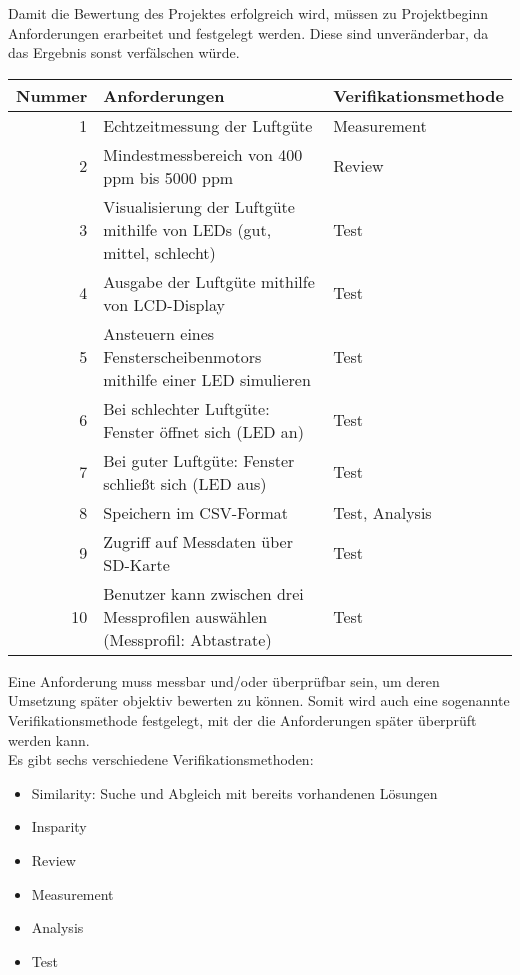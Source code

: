 \label{Anforderungen}

Damit die Bewertung des Projektes erfolgreich wird, müssen zu Projektbeginn Anforderungen erarbeitet und festgelegt werden. Diese sind unveränderbar, da das Ergebnis sonst verfälschen würde.

\begin{table}[!hbt]
	
	\centering
	
	\begin{tabular}{|r| p{8.4cm}|p{4.7cm}|}
		
		\hline
		Nummer & Anforderungen & Verifikationsmethode \\
		\hline
		1 & Echtzeitmessung der Luftgüte & Measurement \\
		\hline
		2 & Mindestmessbereich von 400 ppm bis 5000 ppm & Review \\
		\hline
		3 & Visualisierung der Luftgüte mithilfe von LEDs (gut, mittel, schlecht) & Test \\
		\hline
		4 & Ausgabe der Luftgüte mithilfe von LCD-Display & Test \\
		\hline
		5 & Ansteuern eines Fensterscheibenmotors mithilfe einer LED simulieren & Test \\
		\hline
		6 & Bei schlechter Luftgüte: Fenster öffnet sich (LED an) & Test \\
		\hline
		7 & Bei guter Luftgüte: Fenster schließt sich (LED aus) & Test \\
		\hline
		8 & Speichern im CSV-Format & Test, Analysis\\
		\hline
		9 & Zugriff auf Messdaten über SD-Karte & Test \\
		\hline
		10 & Benutzer kann zwischen drei Messprofilen auswählen (Messprofil: Abtastrate) & Test \\
		\hline
		
	\end{tabular}

\label{tab:Anforderungen}

\end{table}

Eine Anforderung muss messbar und/oder überprüfbar sein, um deren Umsetzung später objektiv bewerten zu können. Somit wird auch eine sogenannte Verifikationsmethode festgelegt, mit der die Anforderungen später überprüft werden kann. \\
Es gibt sechs verschiedene Verifikationsmethoden:
\begin{itemize}
	\item Similarity: Suche und Abgleich mit bereits vorhandenen Lösungen \cite[S. 122]{HelgaMeyer.}
	\item Insparity
	\item Review
	\item Measurement
	\item Analysis
	\item Test
\end{itemize}


